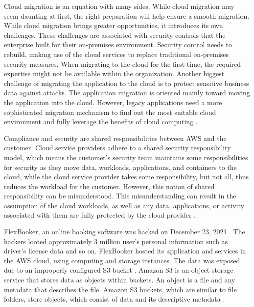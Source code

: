 \par Cloud migration is an equation with many sides. While cloud migration may seem daunting at first, the right preparation will help ensure a smooth migration. While cloud migration brings greater opportunities, it introduces its own challenges. These challenges are associated with security controls that the enterprise built for their on-premises environment. Security control needs to rebuild, making use of the cloud services to replace traditional on-premises security measures. When migrating to the cloud for the first time, the required expertise might not be available within the organization. Another biggest challenge of migrating the application to the cloud is to protect sensitive business data against attacks. The application migration is oriented mainly toward moving the application into the cloud. However, legacy applications need a more sophisticated migration mechanism to find out the most suitable cloud environment and fully leverage the benefits of cloud computing \cite{4}.

\par Compliance and security are shared responsibilities
between AWS and the customer. Cloud service providers
adhere to a shared security responsibility model, which means the customer’s security team maintains some responsibilities for security as they move data, workloads, applications, and containers to the cloud, while the cloud service provider takes some responsibility, but not all, thus reduces the workload for the customer. However, this notion of shared responsibility can be misunderstood. This misunderstanding can result in the assumption of the cloud workloads, as well as any data, applications, or activity associated with them are fully protected by the cloud provider \cite{5}.



\par FlexBooker, an online booking software was hacked on December 23, 2021 \cite{6}\cite{7}. The hackers looted approximately 3 million user's personal information such as driver's license data and so on. FlexBooker hosted its application and services in the AWS cloud, using computing and storage instances. The data was exposed due to an improperly configured S3 bucket \cite{8}. Amazon S3 is an object storage service that stores data as objects within buckets. An object is a file and any metadata that describes the file. Amazon S3 buckets, which are similar to file folders, store objects, which consist of data and its descriptive metadata \cite{9}.



